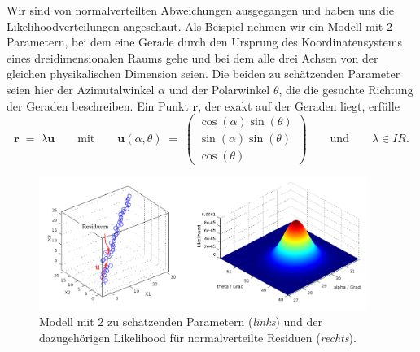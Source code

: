 Wir sind von normalverteilten Abweichungen ausgegangen und haben uns
die Likelihoodverteilungen angeschaut. Als Beispiel nehmen wir ein Modell mit 2 Parametern, bei
dem eine Gerade durch den Ursprung des Koordinatensystems eines dreidimensionalen
Raums gehe und bei dem alle drei Achsen von der gleichen physikalischen Dimension seien.
Die beiden zu schätzenden Parameter seien hier der Azimutalwinkel $\alpha$ und der 
Polarwinkel $\theta$, die die gesuchte Richtung der Geraden beschreiben.
Ein Punkt $\mathbf{r}$, der exakt auf der Geraden liegt, erfülle
\begin{equation}
\mathbf{r} \; = \; \lambda \mathbf{u} \qquad \mathrm{mit} \qquad
\mathbf{u}(\alpha,\theta) \; = \; \left(\begin{array}{c}
\cos(\alpha) \sin(\theta)\\
\sin(\alpha) \sin(\theta)\\
\cos(\theta) \end{array}\right) \qquad \mathrm{und} \qquad \lambda \in I \!\! R.
\end{equation}
\begin{figure}
\begin{center}
\includegraphics[width=0.95\textwidth, angle = 0]{03_vorlesung/media/LSopti_example1.pdf}
\end{center}
\caption{Modell mit 2 zu schätzenden Parametern (\textsl{links}) und der dazugehörigen
Likelihood für normalverteilte Residuen (\textsl{rechts}).\label{LSoptiExample1}}
\end{figure}

